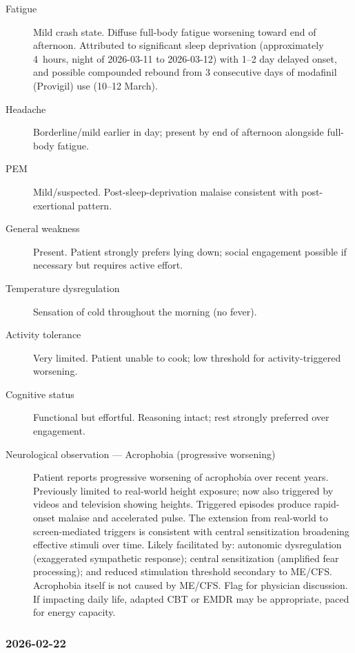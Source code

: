 \begin{description}
  \item[Fatigue] Mild crash state. Diffuse full-body fatigue worsening toward end of
    afternoon. Attributed to significant sleep deprivation (approximately 4~hours,
    night of 2026-03-11 to 2026-03-12) with 1--2 day delayed onset, and possible
    compounded rebound from 3 consecutive days of modafinil (Provigil) use
    (10--12 March).
  \item[Headache] Borderline/mild earlier in day; present by end of afternoon alongside
    full-body fatigue.
  \item[PEM] Mild/suspected. Post-sleep-deprivation malaise consistent with
    post-exertional pattern.
  \item[General weakness] Present. Patient strongly prefers lying down; social engagement
    possible if necessary but requires active effort.
  \item[Temperature dysregulation] Sensation of cold throughout the morning (no fever).
  \item[Activity tolerance] Very limited. Patient unable to cook; low threshold for
    activity-triggered worsening.
  \item[Cognitive status] Functional but effortful. Reasoning intact; rest strongly
    preferred over engagement.
  \item[Neurological observation --- Acrophobia (progressive worsening)] Patient reports
    progressive worsening of acrophobia over recent years. Previously limited to real-world
    height exposure; now also triggered by videos and television showing heights. Triggered
    episodes produce rapid-onset malaise and accelerated pulse. The extension from
    real-world to screen-mediated triggers is consistent with central sensitization
    broadening effective stimuli over time. Likely facilitated by: autonomic dysregulation
    (exaggerated sympathetic response); central sensitization (amplified fear processing);
    and reduced stimulation threshold secondary to ME/CFS. Acrophobia itself is not caused
    by ME/CFS. Flag for physician discussion. If impacting daily life, adapted CBT or EMDR
    may be appropriate, paced for energy capacity.
\end{description}

\subsubsection*{2026-02-22}
\label{sym:2026-02-22}

